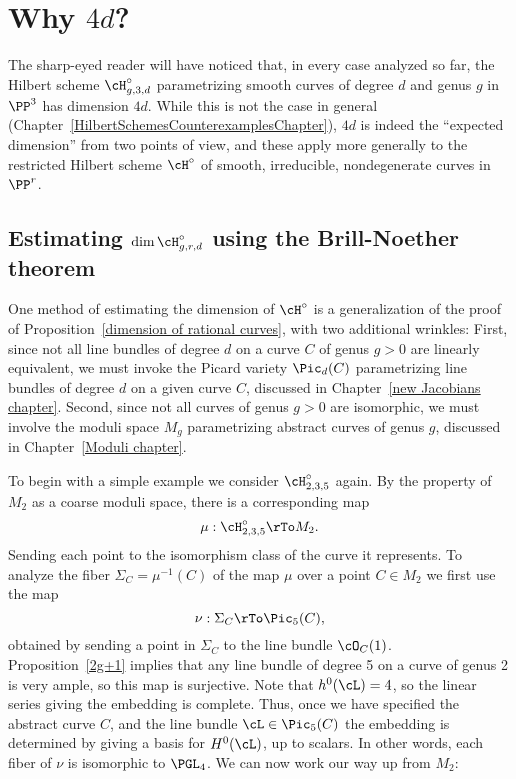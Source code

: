 \section{Why  $4d$?}\label{estimating dim hilb}

The sharp-eyed reader will have noticed that, in every case analyzed so far,  the Hilbert scheme
$\cH^\circ_{g,3,d}$ parametrizing smooth curves of degree $d$ and genus $g$ in $\PP^3$ has dimension $4d$. While this is not the case in general (Chapter~\ref{HilbertSchemesCounterexamplesChapter}), $4d$ is indeed the ``expected dimension'' from two points of view,
and these apply more generally to the restricted Hilbert scheme $\cH^\circ$ of smooth, irreducible, nondegenerate curves in $\PP^r$.

\subsection{Estimating $\dim \cH^\circ_{g,r,d}$ using the Brill-Noether theorem}

One method of estimating  the dimension of $\cH^\circ$ is a generalization of the proof of Proposition~\ref{dimension of rational curves}, with two additional wrinkles: First, since not all line bundles of degree $d$ on a curve $C$ of genus $g > 0$ are linearly equivalent, we must invoke the Picard variety $\Pic_d(C)$ parametrizing line bundles of degree $d$ on a given curve $C$, discussed in Chapter~\ref{new Jacobians chapter}. Second, since not all curves of genus $g > 0$ are isomorphic, we must involve the moduli space  $M_g$ parametrizing abstract curves of genus $g$, discussed in Chapter~\ref{Moduli chapter}.

To begin with a simple example we consider $\cH^\circ_{2,3,5}$ again. By the property of $M_{2}$ as a coarse moduli space, there is a corresponding map
$$
\mu : \cH^\circ_{2,3,5} \rTo M_2.
$$
Sending each point to the isomorphism class of the curve it represents.
To analyze the fiber $\Sigma_C =\mu^{-1}(C)$ of the map $\mu$ over a point $C \in M_2$ we first use the map
$$
\nu : \Sigma_C \rTo \Pic_5(C),
$$
obtained by sending a point in $\Sigma_C$ to the line bundle $\cO_C(1)$. Proposition~\ref{2g+1} implies that any line bundle of degree 5 on a curve of genus 2 is very ample, so this map is surjective. Note that 
$h^0(\cL) = 4$, so the linear series  giving the embedding is complete. Thus, once we have specified the abstract curve $C$, and the line bundle $\cL \in \Pic_5(C)$ the embedding is determined by giving a basis for $H^0(\cL)$, up to scalars. In other words, each fiber of $\nu$ is isomorphic to $\PGL_4$. We can now work our way up from $M_2$:

